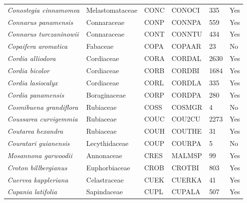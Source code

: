 \documentclass[11pt]{article}
\begin{document}
\begin{longtable}{@{}llllll@{}}
\textit{Conostegia cinnamomea}                        & Melastomataceae  & CONC   & CONOCI & 335             & Yes       \\
\textit{Connarus panamensis}                          & Connaraceae      & CONP   & CONNPA & 559             & Yes       \\
\textit{Connarus turczaninowii}                       & Connaraceae      & CONT   & CONNTU & 434             & Yes       \\
\textit{Copaifera aromatica}                          & Fabaceae         & COPA   & COPAAR & 23              & No        \\
\textit{Cordia alliodora}                             & Cordiaceae       & CORA   & CORDAL & 2630            & Yes       \\
\textit{Cordia bicolor}                               & Cordiaceae       & CORB   & CORDBI & 1684            & Yes       \\
\textit{Cordia lasiocalyx}                            & Cordiaceae       & CORL   & CORDLA & 335             & Yes       \\
\textit{Cordia panamensis}                            & Boraginaceae     & CORP   & CORDPA & 280             & Yes       \\
\textit{Cosmibuena grandiflora}                       & Rubiaceae        & COSS   & COSMGR & 4               & No        \\
\textit{Coussarea curvigemmia}                        & Rubiaceae        & COUC   & COU2CU & 2273            & Yes       \\
\textit{Coutarea hexandra}                            & Rubiaceae        & COUH   & COUTHE & 31              & Yes       \\
\textit{Couratari guianensis}                         & Lecythidaceae    & COUP   & COURPA & 5               & No        \\
\textit{Mosannona garwoodii}                          & Annonaceae       & CRES   & MALMSP & 99              & Yes       \\
\textit{Croton billbergianus}                         & Euphorbiaceae    & CROB   & CROTBI & 803             & Yes       \\
\textit{Cuervea kappleriana}                          & Celastraceae     & CUEK   & CUERKA & 41              & Yes       \\
\textit{Cupania latifolia}                            & Sapindaceae      & CUPL   & CUPALA & 507             & Yes       \\

\end{longtable}
\end{document}

